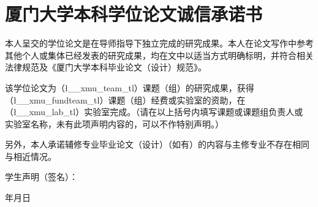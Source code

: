 \ExplSyntaxOn
\chapter*{厦门大学本科学位论文诚信承诺书}
\setcounter{page}{1}

{\fontsize{14pt}{21pt}\selectfont
    
    本人呈交的学位论文是在导师指导下独立完成的研究成果。本人在论文写作中参考其他个人或集体已经发表的研究成果，均在文中以适当方式明确标明，并符合相关法律规范及《厦门大学本科毕业论文（设计）规范》。
    \par
    该学位论文为（\l__xmu_team_tl）课题（组）的研究成果，获得（\l__xmu_fundteam_tl）课题（组）经费或实验室的资助，在（\l__xmu_lab_tl）实验室完成。（请在以上括号内填写课题或课题组负责人或
    实验室名称，未有此项声明内容的，可以不作特别声明。）
    \par	
    另外，本人承诺辅修专业毕业论文（设计）（如有）的内容与主修专业不存在相同与相近情况。
    \par
    \vspace{30pt}
    
    \hfill 学生声明（签名）：\hspace*{4cm}
    \par\vspace{2ex}
    \hfill 年\hspace{26pt}月\hspace{26pt}日\hspace*{2cm}
}

\ExplSyntaxOff